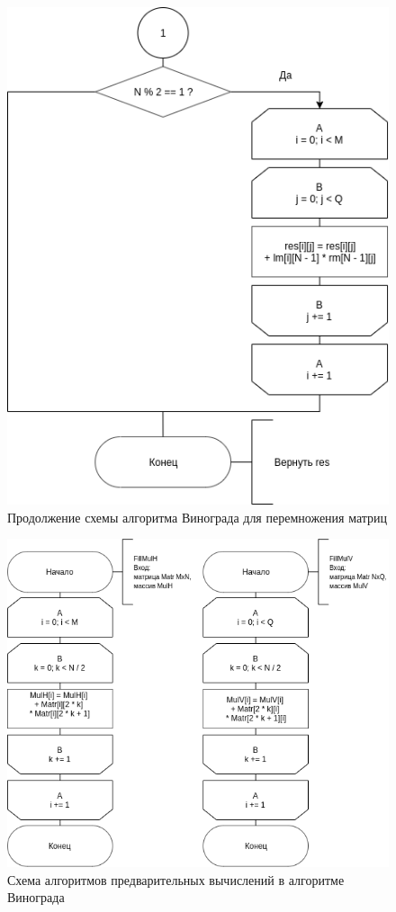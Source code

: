 \begin{figure}[h]
	\centering
	\includegraphics{schemes/win-bottom}
	\caption{Продолжение схемы алгоритма Винограда для перемножения матриц}
	\label{scheme:win-bottom}
\end{figure}


\begin{figure}[h]
	\centering
	\includegraphics[scale=0.82]{schemes/fillmul}
	\caption{Схема алгоритмов предварительных вычислений в алгоритме Винограда}
	\label{scheme:fillmul}
\end{figure}


